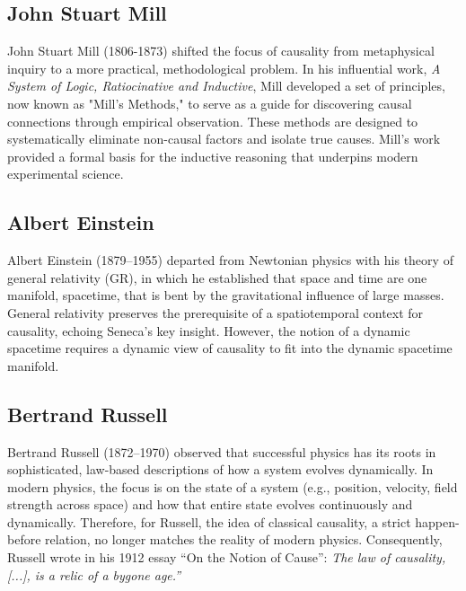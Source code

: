 \subsection{John Stuart Mill}
\label{sec:history_stuart_mill}

John Stuart Mill (1806-1873) shifted the focus of causality from metaphysical inquiry to a more practical, methodological problem. In his influential work, \textit{A System of Logic, Ratiocinative and Inductive}\cite{mill2023system}, Mill developed a set of principles, now known as "Mill's Methods," to serve as a guide for discovering causal connections through empirical observation. These methods are designed to systematically eliminate non-causal factors and isolate true causes. Mill's work provided a formal basis for the inductive reasoning that underpins modern experimental science.


\subsection{Albert Einstein}
\label{sec:history_einstein}

Albert Einstein (1879--1955) departed from Newtonian physics with his theory of general relativity\cite{EinsteinPapers1915} (GR), in which he established that space and time are one manifold, spacetime, that is bent by the gravitational influence of large masses. General relativity preserves the prerequisite of a spatiotemporal context for causality, echoing Seneca's key insight. However, the notion of a dynamic spacetime requires a dynamic view of causality to fit into the dynamic spacetime manifold.

\subsection{Bertrand Russell}
\label{sec:history_Russell}

Bertrand Russell (1872--1970) observed that successful physics has its roots in sophisticated, law-based descriptions of how a system evolves dynamically. In modern physics, the focus is on the state of a system (e.g., position, velocity, field strength across space) and how that entire state evolves continuously and dynamically. Therefore, for Russell, the idea of classical causality, a strict happen-before relation, no longer matches the reality of modern physics. Consequently, Russell wrote in his 1912 essay ``On the Notion of Cause''\cite{RussellOnCause}:  \textit{The law of causality, [...], is a relic of a bygone age.''} 

